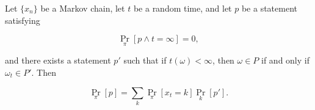 Let $\{x_n\}$ be a Markov chain, let $t$ be a random time, and let $p$ be a statement satisfying

$$\Pr_{\pi}[p \land t = \infty] = 0,$$

and there exists a statement $p'$ such that if $t(\omega) < \infty$, then $\omega \in P$ if and only if $\omega_t \in P'$. Then

$$\Pr_{\pi}[p] = \sum_{k} \Pr_{\pi}[x_t = k] \Pr_k[p'].$$

